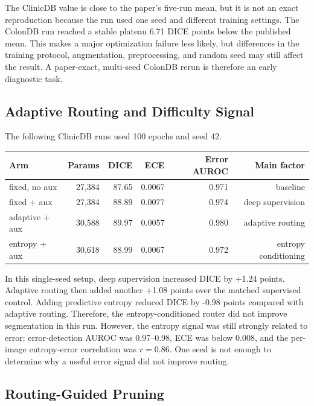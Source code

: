 \documentclass[10pt,a4paper]{article}
\begin{document}
The ClinicDB value is close to the paper's five-run mean, but it is not an exact reproduction because the run used one seed and different training settings. The ColonDB run reached a stable plateau 6.71 DICE points below the published mean. This makes a major optimization failure less likely, but differences in the training protocol, augmentation, preprocessing, and random seed may still affect the result. A paper-exact, multi-seed ColonDB rerun is therefore an early diagnostic task.

\subsection{Adaptive Routing and Difficulty Signal}

The following ClinicDB runs used 100 epochs and seed 42.

\begin{center}\small
\begin{tabular}{@{}lrrrrr@{}}
\toprule
Arm & Params & DICE & ECE & Error AUROC & Main factor \\
\midrule
fixed, no aux & 27{,}384 & 87.65 & 0.0067 & 0.971 & baseline \\
fixed + aux & 27{,}384 & 88.89 & 0.0077 & 0.974 & deep supervision \\
adaptive + aux & 30{,}588 & 89.97 & 0.0057 & 0.980 & adaptive routing \\
entropy + aux & 30{,}618 & 88.99 & 0.0067 & 0.972 & entropy conditioning \\
\bottomrule
\end{tabular}
\end{center}

In this single-seed setup, deep supervision increased DICE by +1.24 points. Adaptive routing then added another +1.08 points over the matched supervised control. Adding predictive entropy reduced DICE by -0.98 points compared with adaptive routing. Therefore, the entropy-conditioned router did not improve segmentation in this run. However, the entropy signal was still strongly related to error: error-detection AUROC was 0.97--0.98, ECE was below 0.008, and the per-image entropy-error correlation was $r=0.86$. One seed is not enough to determine why a useful error signal did not improve routing.

\subsection{Routing-Guided Pruning}
\end{document}
